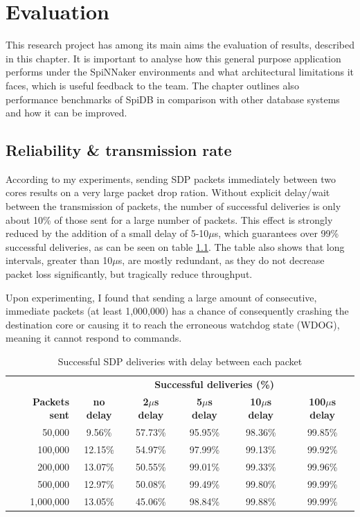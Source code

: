 \chapter{Evaluation}
\label{cha:eval}
This research project has among its main aims the evaluation of results, described in this chapter. It is important to analyse how this general purpose application performs under the SpiNNaker environments and what architectural limitations it faces, which is useful feedback to the team. The chapter outlines also performance benchmarks of SpiDB in comparison with other database systems and how it can be improved.

\section{Reliability \& transmission rate}
\label{sec:eval_comm_rel}

According to my experiments, sending SDP packets immediately between two cores results on a very large packet drop ration. Without explicit delay/wait between the transmission of packets, the number of successful deliveries is only about 10\% of those sent for a large number of packets. This effect is strongly reduced by the addition of a small delay of 5-10$\mu$s, which guarantees over 99\% successful deliveries, as can be seen on table \ref{table:sdp_deliveries}. The table also shows that long intervals, greater than 10$\mu$s, are mostly redundant, as they do not decrease packet loss significantly, but tragically reduce throughput.

Upon experimenting, I found that sending a large amount of consecutive, immediate packets (at least 1,000,000) has a chance of consequently crashing the destination core or causing it to reach the erroneous watchdog state (WDOG), meaning it cannot respond to commands.

\begin{table}
\begin{tabular}{ r | c | c | c | c | c }
 & \multicolumn{5}{c}{\textbf{Successful deliveries (\%)}} \\

\textbf{Packets sent} & \textbf{no delay} & \textbf{2$\mu$s delay} & \textbf{5$\mu$s delay} & \textbf{10$\mu$s delay} & \textbf{100$\mu$s delay} \\
50,000 & 9.56\% & 57.73\% & 95.95\% & 98.36\% & 99.85\% \\
100,000 & 12.15\% & 54.97\% & 97.99\% & 99.13\% & 99.92\% \\
200,000 & 13.07\% & 50.55\% & 99.01\% & 99.33\% & 99.96\% \\
500,000 & 12.97\% & 50.08\% & 99.49\% & 99.80\% & 99.99\% \\
1,000,000 & 13.05\% & 45.06\% & 98.84\% & 99.88\% & 99.99\% \\
\end{tabular}
\caption{Successful SDP deliveries with delay between each packet}
\label{table:sdp_deliveries}
\end{table}

